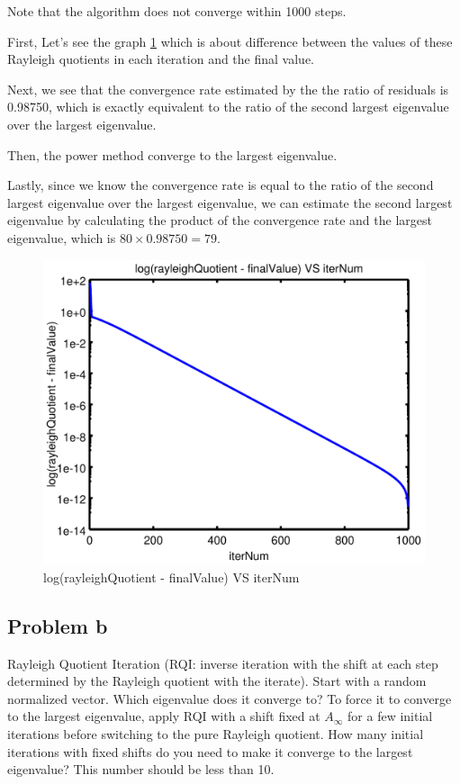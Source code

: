 \documentclass[12pt,oneside,a4paper]{article}
\newcommand{\subproblem}[1]
{
    \subsection*{Problem {#1}}
}
\begin{document}
Note that the algorithm does not converge within 1000 steps.

First, Let's see the graph \ref{graph} which is about difference between the values of these Rayleigh quotients in each iteration and the final value.

Next, we see that the convergence rate estimated by the the ratio of residuals is 0.98750, which is exactly equivalent to the ratio of the second largest eigenvalue over the largest eigenvalue. 

Then, the power method converge to the largest eigenvalue. 

\clearpage Lastly, since we know the convergence rate is equal to the ratio of the second largest eigenvalue over the largest eigenvalue, we can estimate the second largest eigenvalue by calculating the product of the convergence rate and the largest eigenvalue, which is $80 \times 0.98750 = 79$.

\begin{figure}[!ht]
  \centering
  \includegraphics[scale=0.5]{./code/p1-crop.pdf}
  \caption{log(rayleighQuotient - finalValue) VS iterNum}
  \label{graph}
\end{figure}

\subproblem{b}
Rayleigh Quotient Iteration (RQI: inverse iteration with the shift at each step determined by the Rayleigh quotient with the iterate). Start with a random normalized vector. Which eigenvalue does it converge to? To force it to converge to the largest eigenvalue, apply RQI with a shift fixed at $A_{\infty}$ for a few initial iterations before switching to the pure Rayleigh quotient. How many initial iterations with fixed shifts do you need to make it converge to the largest eigenvalue? This number should be less than 10.
\end{document}

